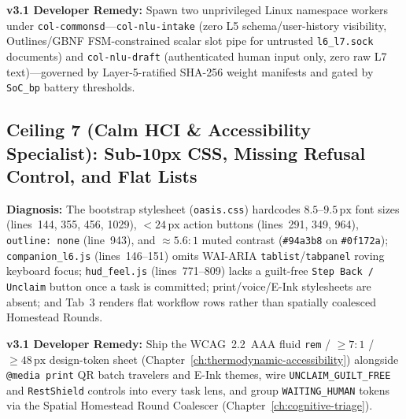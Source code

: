 \textbf{v3.1 Developer Remedy:} Spawn two unprivileged Linux namespace workers under \texttt{col-commonsd}---\texttt{col-nlu-intake} (zero L5 schema/user-history visibility, Outlines/GBNF FSM-constrained scalar slot pipe for untrusted \texttt{l6\_l7.sock} documents) and \texttt{col-nlu-draft} (authenticated human input only, zero raw L7 text)---governed by Layer-5-ratified SHA-256 weight manifests and gated by \texttt{SoC\_bp} battery thresholds.

\subsection{Ceiling 7 (Calm HCI \& Accessibility Specialist): Sub-10px CSS, Missing Refusal Control, and Flat Lists}
\textbf{Diagnosis:} The bootstrap stylesheet (\texttt{oasis.css}) hardcodes $8.5\text{--}9.5\,\mathrm{px}$ font sizes (lines~144, 355, 456, 1029), $< 24\,\mathrm{px}$ action buttons (lines~291, 349, 964), \texttt{outline: none} (line~943), and $\approx 5.6:1$ muted contrast (\texttt{\#94a3b8} on \texttt{\#0f172a}); \texttt{companion\_l6.js} (lines~146--151) omits WAI-ARIA \texttt{tablist}/\texttt{tabpanel} roving keyboard focus; \texttt{hud\_feel.js} (lines~771--809) lacks a guilt-free \texttt{Step Back / Unclaim} button once a task is committed; print/voice/E-Ink stylesheets are absent; and Tab~3 renders flat workflow rows rather than spatially coalesced Homestead Rounds.

\textbf{v3.1 Developer Remedy:} Ship the WCAG~2.2~AAA fluid \texttt{rem} / $\ge 7:1$ / $\ge 48\,\mathrm{px}$ design-token sheet (Chapter~\ref{ch:thermodynamic-accessibility}) alongside \texttt{@media print} QR batch travelers and E-Ink themes, wire \texttt{UNCLAIM\_GUILT\_FREE} and \texttt{RestShield} controls into every task lens, and group \texttt{WAITING\_HUMAN} tokens via the Spatial Homestead Round Coalescer (Chapter~\ref{ch:cognitive-triage}).

